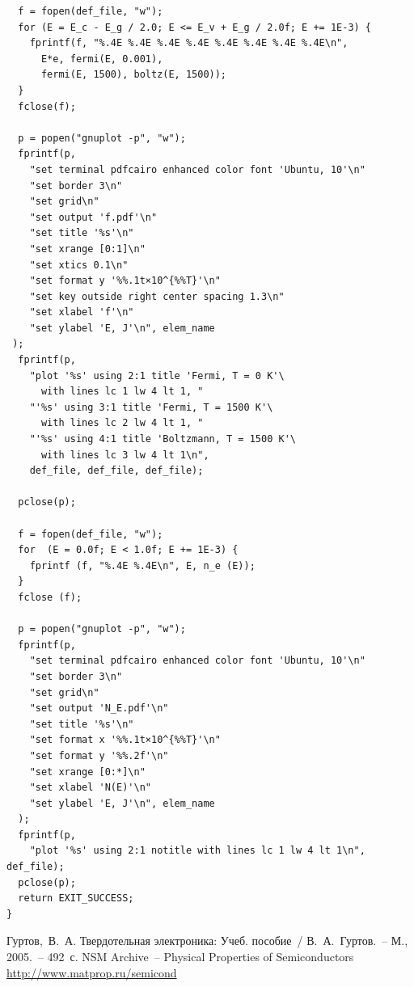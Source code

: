 \documentclass[14pt,a4paper]{extarticle}
\begin{document}
{\begin{verbatim}
  f = fopen(def_file, "w");
  for (E = E_c - E_g / 2.0; E <= E_v + E_g / 2.0f; E += 1E-3) {
    fprintf(f, "%.4E %.4E %.4E %.4E %.4E %.4E %.4E %.4E\n",
      E*e, fermi(E, 0.001),
      fermi(E, 1500), boltz(E, 1500));
  }
  fclose(f);

  p = popen("gnuplot -p", "w");
  fprintf(p,
    "set terminal pdfcairo enhanced color font 'Ubuntu, 10'\n"
    "set border 3\n"
    "set grid\n"
    "set output 'f.pdf'\n"
    "set title '%s'\n"
    "set xrange [0:1]\n"
    "set xtics 0.1\n"
    "set format y '%%.1t×10^{%%T}'\n"
    "set key outside right center spacing 1.3\n"
    "set xlabel 'f'\n"
    "set ylabel 'E, J'\n", elem_name
 );
  fprintf(p,
    "plot '%s' using 2:1 title 'Fermi, T = 0 K'\
      with lines lc 1 lw 4 lt 1, "
    "'%s' using 3:1 title 'Fermi, T = 1500 K'\
      with lines lc 2 lw 4 lt 1, "
    "'%s' using 4:1 title 'Boltzmann, T = 1500 K'\
      with lines lc 3 lw 4 lt 1\n",
    def_file, def_file, def_file);

  pclose(p);

  f = fopen(def_file, "w");
  for  (E = 0.0f; E < 1.0f; E += 1E-3) {
    fprintf (f, "%.4E %.4E\n", E, n_e (E));
  }
  fclose (f);

  p = popen("gnuplot -p", "w");
  fprintf(p,
    "set terminal pdfcairo enhanced color font 'Ubuntu, 10'\n"
    "set border 3\n"
    "set grid\n"
    "set output 'N_E.pdf'\n"
    "set title '%s'\n"
    "set format x '%%.1t×10^{%%T}'\n"
    "set format y '%%.2f'\n"
    "set xrange [0:*]\n"
    "set xlabel 'N(E)'\n"
    "set ylabel 'E, J'\n", elem_name
  );
  fprintf(p,
    "plot '%s' using 2:1 notitle with lines lc 1 lw 4 lt 1\n", def_file);
  pclose(p);
  return EXIT_SUCCESS;
}
  \end{verbatim}
  }

  \newpage

  \begin{thebibliography}{9}
     Гуртов,~В.~А. Твердотельная электроника: Учеб. пособие~/
      В.~А.~Гуртов.~-- М., 2005.~-- 492~с.
     NSM Archive~-- Physical Properties of Semiconductors \\
      \url{http://www.matprop.ru/semicond}
  \end{thebibliography}
\end{document}
